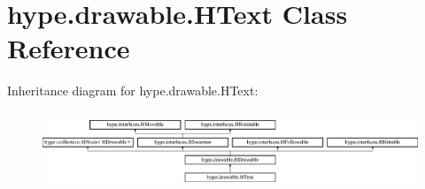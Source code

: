 \hypertarget{classhype_1_1drawable_1_1_h_text}{\section{hype.\-drawable.\-H\-Text Class Reference}
\label{classhype_1_1drawable_1_1_h_text}
}
Inheritance diagram for hype.\-drawable.\-H\-Text\-:\begin{figure}[H]
\begin{center}
\leavevmode
\includegraphics[height=2.333333cm]{classhype_1_1drawable_1_1_h_text}
\end{center}
\end{figure}
